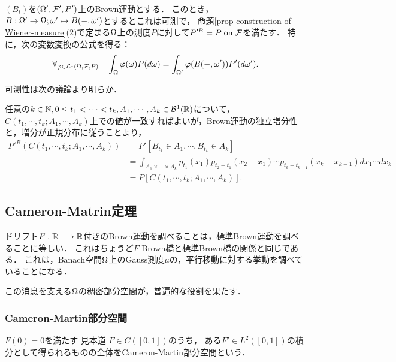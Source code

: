 \documentclass[uplatex,dvipdfmx]{jsreport}
\begin{document}
\begin{lemma}[Wiener測度の特徴付け]
    $(B_t)$を$(\Omega',\mathcal{F}',P')$上のBrown運動とする．
    このとき，$B:\Omega'\to\Omega;\omega'\mapsto B(-,\omega')$とするとこれは可測で，
    命題\ref{prop-construction-of-Wiener-measure}(2)で定まる$\Omega$上の測度$P$に対して$P'^B=P\;\mathrm{on}\;\mathcal{F}$を満たす．
    特に，次の変数変換の公式を得る：
    \[\forall_{\varphi\in\mathcal{L}^1(\Omega,\mathcal{F},P)}\quad\int_\Omega\varphi(\omega)P(d\omega)=\int_{\Omega'}\varphi(B(-,\omega'))P'(d\omega').\]
\end{lemma}
\begin{Proof}
    可測性は次の議論より明らか．

    任意の$k\in\mathbb{N},0\le t_1<\cdots<t_k,A_1,\cdots,A_k\in\mathcal{B}^1(\mathbb{R})$について，$C(t_1,\cdots,t_k;A_1,\cdots,A_k)$上での値が一致すればよいが，Brown運動の独立増分性と，増分が正規分布に従うことより，
    \begin{align*}
        P'^B(C(t_1,\cdots,t_k;A_1,\cdots,A_k))&=P'[B_{t_1}\in A_1,\cdots,B_{t_k}\in A_k]\\
        &=\int_{A_1\times\cdots\times A_k}p_{t_1}(x_1)p_{t_2-t_1}(x_2-x_1)\cdots p_{t_k-t_{k-1}}(x_k-x_{k-1})dx_1\cdots dx_k\\
        &=P[C(t_1,\cdots,t_k;A_1,\cdots,A_k)].
    \end{align*}
\end{Proof}

\subsection{Cameron-Matrin定理}

\begin{tcolorbox}[colframe=ForestGreen, colback=ForestGreen!10!white,breakable,colbacktitle=ForestGreen!40!white,coltitle=black,fonttitle=\bfseries\sffamily,
title=]
    ドリフト$F:\mathbb{R}_+\to\mathbb{R}$付きのBrown運動を調べることは，標準Brown運動を調べることに等しい．
    これはちょうど$F$-Brown橋と標準Brown橋の関係と同じである．
    これは，Banach空間$\Omega$上のGauss測度$\mu$の，平行移動に対する挙動を調べていることになる．

    この消息を支える$\Omega$の稠密部分空間が，普遍的な役割を果たす．
\end{tcolorbox}

\subsubsection{Cameron-Martin部分空間}

\begin{tcolorbox}[colframe=ForestGreen, colback=ForestGreen!10!white,breakable,colbacktitle=ForestGreen!40!white,coltitle=black,fonttitle=\bfseries\sffamily,
title=]
    $F(0)=0$を満たす
    見本道
    $F\in C([0,1])$のうち，
    ある$F'\in L^2([0,1])$の積分として得られるものの全体をCameron-Martin部分空間という．
\end{tcolorbox}
\end{document}
